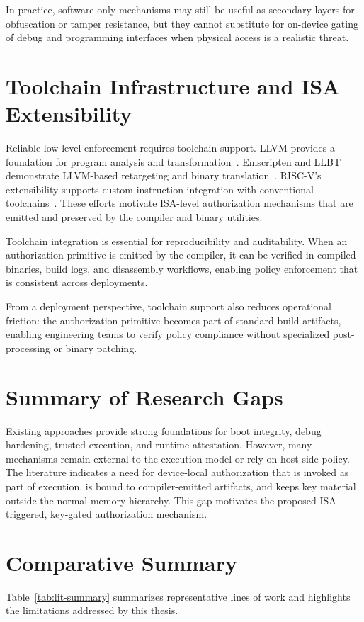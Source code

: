 In practice, software-only mechanisms may still be useful as secondary layers for obfuscation or
tamper resistance, but they cannot substitute for on-device gating of debug and programming
interfaces when physical access is a realistic threat.

\section{Toolchain Infrastructure and ISA Extensibility}
Reliable low-level enforcement requires toolchain support. LLVM provides a foundation for program
analysis and transformation~\cite{lattner2004llvm}. Emscripten and LLBT demonstrate LLVM-based
retargeting and binary translation~\cite{zakai2011emscripten,shen2012llbt}. RISC-V’s extensibility
supports custom instruction integration with conventional toolchains~\cite{waterman2014riscv}.
These efforts motivate ISA-level authorization mechanisms that are emitted and preserved by the
compiler and binary utilities.

Toolchain integration is essential for reproducibility and auditability. When an authorization
primitive is emitted by the compiler, it can be verified in compiled binaries, build logs, and
disassembly workflows, enabling policy enforcement that is consistent across deployments.

From a deployment perspective, toolchain support also reduces operational friction: the
authorization primitive becomes part of standard build artifacts, enabling engineering teams to
verify policy compliance without specialized post-processing or binary patching.

\section{Summary of Research Gaps}
Existing approaches provide strong foundations for boot integrity, debug hardening, trusted
execution, and runtime attestation. However, many mechanisms remain external to the execution
model or rely on host-side policy. The literature indicates a need for device-local authorization
that is invoked as part of execution, is bound to compiler-emitted artifacts, and keeps key
material outside the normal memory hierarchy. This gap motivates the proposed ISA-triggered,
key-gated authorization mechanism.

\section{Comparative Summary}
Table~\ref{tab:lit-summary} summarizes representative lines of work and highlights the
limitations addressed by this thesis.

